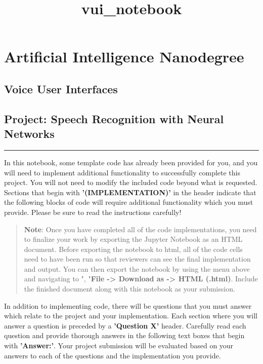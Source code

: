 \documentclass[11pt]{article}
\title{vui\_notebook}
\begin{document}
    
    
    \maketitle
    
    

    
    \section{Artificial Intelligence
Nanodegree}\label{artificial-intelligence-nanodegree}

\subsection{Voice User Interfaces}\label{voice-user-interfaces}

\subsection{Project: Speech Recognition with Neural
Networks}\label{project-speech-recognition-with-neural-networks}

\begin{center}\rule{0.5\linewidth}{\linethickness}\end{center}

In this notebook, some template code has already been provided for you,
and you will need to implement additional functionality to successfully
complete this project. You will not need to modify the included code
beyond what is requested. Sections that begin with
\textbf{'(IMPLEMENTATION)'} in the header indicate that the following
blocks of code will require additional functionality which you must
provide. Please be sure to read the instructions carefully!

\begin{quote}
\textbf{Note}: Once you have completed all of the code implementations,
you need to finalize your work by exporting the Jupyter Notebook as an
HTML document. Before exporting the notebook to html, all of the code
cells need to have been run so that reviewers can see the final
implementation and output. You can then export the notebook by using the
menu above and navigating to \n", "\textbf{File -\textgreater{} Download
as -\textgreater{} HTML (.html)}. Include the finished document along
with this notebook as your submission.
\end{quote}

In addition to implementing code, there will be questions that you must
answer which relate to the project and your implementation. Each section
where you will answer a question is preceded by a \textbf{'Question X'}
header. Carefully read each question and provide thorough answers in the
following text boxes that begin with \textbf{'Answer:'}. Your project
submission will be evaluated based on your answers to each of the
questions and the implementation you provide.
\end{document}
